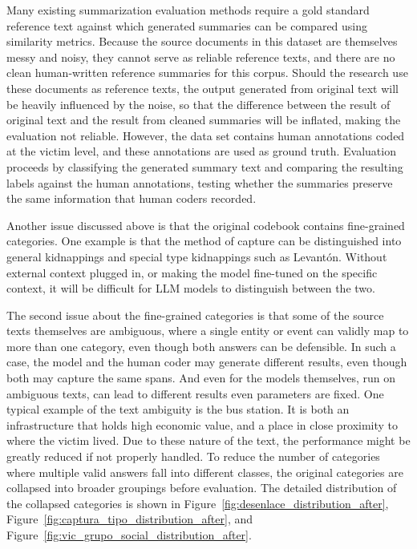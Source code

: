 \documentclass{article}
\begin{document}
Many existing summarization evaluation methods require a gold standard reference text against which generated summaries can be compared using similarity metrics. Because the source documents in this dataset are themselves messy and noisy, they cannot serve as reliable reference texts, and there are no clean human-written reference summaries for this corpus. Should the research use these documents as reference texts, the output generated from original text will be heavily influenced by the noise, so that the difference between the result of original text and the result from cleaned summaries will be inflated, making the evaluation not reliable. However, the data set contains human annotations coded at the victim level, and these annotations are used as ground truth. Evaluation proceeds by classifying the generated summary text and comparing the resulting labels against the human annotations, testing whether the summaries preserve the same information that human coders recorded. 

Another issue discussed above is that the original codebook contains fine-grained categories. One example is that the method of capture can be distinguished into general kidnappings and special type kidnappings such as Levantón. Without external context plugged in, or making the model fine-tuned on the specific context, it will be difficult for LLM models to distinguish between the two.


The second issue about the fine-grained categories is that some of the source texts themselves are ambiguous, where a single entity or event can validly map to more than one category, even though both answers can be defensible. In such a case, the model and the human coder may generate different results, even though both may capture the same spans. And even for the models themselves, run on ambiguous texts, can lead to different results even parameters are fixed. One typical example of the text ambiguity is the bus station. It is both an infrastructure that holds high economic value, and a place in close proximity to where the victim lived. Due to these nature of the text, the performance might be greatly reduced if not properly handled. To reduce the number of categories where multiple valid answers fall into different classes, the original categories are collapsed into broader groupings before evaluation. The detailed distribution of the collapsed categories is shown in Figure~\ref{fig:desenlace_distribution_after}, Figure~\ref{fig:captura_tipo_distribution_after}, and Figure~\ref{fig:vic_grupo_social_distribution_after}.
\end{document}

